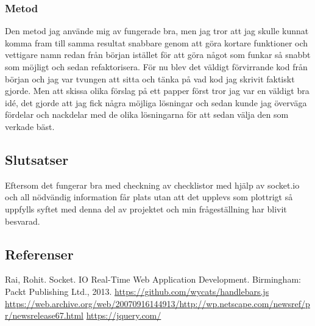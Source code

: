 \subsubsection{Metod}
Den metod jag använde mig av fungerade bra, men jag tror att jag skulle kunnat komma fram till samma resultat snabbare genom att göra kortare funktioner och vettigare namn redan från början istället för att göra något som funkar så snabbt som möjligt och sedan refaktorisera. För nu blev det väldigt förvirrande kod från början och jag var tvungen att sitta och tänka på vad kod jag skrivit faktiskt gjorde. Men att skissa olika förslag på ett papper först tror jag var en väldigt bra idé, det gjorde att jag fick några möjliga lösningar och sedan kunde jag överväga fördelar och nackdelar med de olika lösningarna för att sedan välja den som verkade bäst.

\subsection{Slutsatser}
Eftersom det fungerar bra med checkning av checklistor med hjälp av socket.io och all nödvändig information får plats utan att det upplevs som plottrigt så uppfylls syftet med denna del av projektet och min frågeställning har blivit besvarad.

\subsection{Referenser}
\vspace{-9mm}
\begin{thebibliography}{9}
 Rai, Rohit. Socket. IO Real-Time Web Application Development. Birmingham: Packt Publishing Ltd., 2013.
\url{https://github.com/wycats/handlebars.js}
\url{https://web.archive.org/web/20070916144913/http://wp.netscape.com/newsref/pr/newsrelease67.html}
\url{https://jquery.com/}
\end{thebibliography}